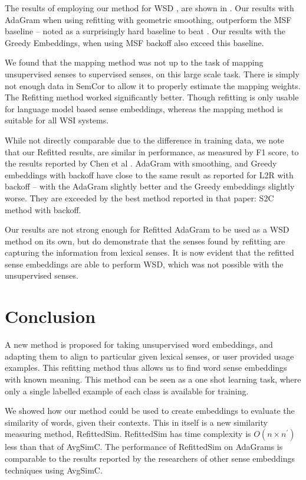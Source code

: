 \documentclass{sig-alternate}
\begin{document}
The results of employing our method for WSD , are shown in . Our results with AdaGram when using refitting with geometric smoothing, outperform the MSF baseline -- noted as a surprisingly hard baseline to beat \parencite{Chen2014}. Our results with the Greedy Embeddings, when using MSF backoff also exceed this baseline.

We found that the mapping method \parencite{agirre2006}  was not up to the task of mapping unsupervised senses to supervised senses, on this large scale task. There is simply not enough data in SemCor to allow it to properly estimate the mapping weights. The Refitting method worked significantly better. Though refitting is only usable for language model based sense embeddings, whereas the mapping method is suitable for all WSI systems.

While not directly comparable due to the difference in training data, we note that our Refitted results, are similar in performance, as measured by F1 score, to the results reported by Chen et al \parencite{Chen2014}.
AdaGram with smoothing, and Greedy embeddings with backoff have close to the same result as reported for L2R with backoff -- with the AdaGram slightly better and the Greedy embeddings slightly worse. They are exceeded by the best method reported in that paper: S2C method with backoff.

Our results are not strong enough for Refitted AdaGram to be used as a WSD method on its own, but do demonstrate that the senses found by refitting are capturing the information from lexical senses.  It is now evident that the refitted sense embeddings are able to perform WSD, which was not possible with the unsupervised senses. 

\section{Conclusion}\label{conclusion}

A new method is proposed for taking unsupervised word embeddings, and adapting them to align to particular given lexical senses, or user provided usage examples. This refitting method thus allows us to find word sense embeddings with known meaning. This method can be seen as a one shot learning task, where only a single labelled example of each class is available for training.

We showed how our method could be used to create embeddings to evaluate the similarity of words, given their contexts. This in itself is a new similarity measuring method, RefittedSim.  RefittedSim has time complexity is $O(n \times n^\prime)$ less than that of AvgSimC. The performance of RefittedSim on AdaGrams is comparable to the results reported by the researchers of other sense embeddings techniques using AvgSimC.
\end{document}
